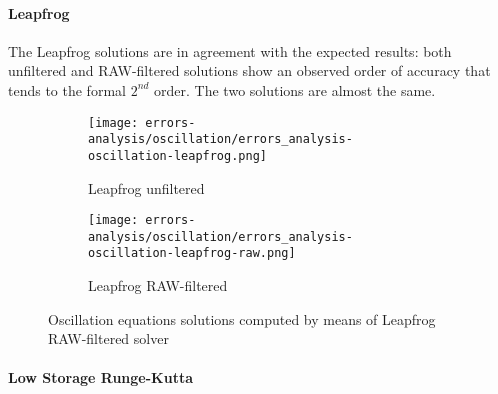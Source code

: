 \documentclass[pdftex,preprint,3p,times,numbers]{elsarticle}
\begin{document}
\paragraph{Leapfrog}

The Leapfrog solutions are in agreement with the expected results: both unfiltered and RAW-filtered solutions show an observed order of accuracy that tends to the formal $2^{nd}$ order. The two solutions are almost the same.

\begin{figure}[!ht]
  \centering
  \begin{subfigure}[b]{0.45\textwidth}
    \centering
    \texttt{[image: errors-analysis/oscillation/errors\_analysis-oscillation-leapfrog.png]}
    \caption{Leapfrog unfiltered}\label{fig:results-oscillation-leapfrog-unfiltered}
  \end{subfigure}\quad%
  \begin{subfigure}[b]{0.45\textwidth}
    \centering
    \texttt{[image: errors-analysis/oscillation/errors\_analysis-oscillation-leapfrog-raw.png]}
    \caption{Leapfrog RAW-filtered}\label{fig:results-oscillation-leapfrog-raw}
  \end{subfigure}
  \caption{Oscillation equations solutions computed by means of Leapfrog RAW-filtered solver}\label{fig:results-oscillation-leapfrog}
\end{figure}

\paragraph{Low Storage Runge-Kutta}
\end{document}
